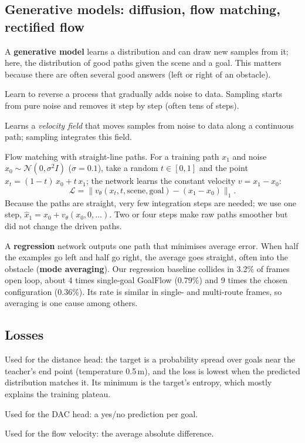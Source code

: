 \documentclass[11pt,a4paper]{article}
\newcommand{\term}[1]{\textbf{#1}}
\begin{document}
\subsection{Generative models: diffusion, flow matching, rectified flow}
A \term{generative model} learns a distribution and can draw new samples from it; here, the distribution of
good paths given the scene and a goal. This matters because there are often several good answers (left or
right of an obstacle).
\begin{description}[style=nextline,leftmargin=0pt]
  \item[Diffusion models] Learn to reverse a process that gradually adds noise to data. Sampling starts from
        pure noise and removes it step by step (often tens of steps).
  \item[Flow matching] Learns a \emph{velocity field} that moves samples from noise to data along a
        continuous path; sampling integrates this field.
  \item[Rectified flow] Flow matching with straight-line paths. For a training path $x_1$ and noise
        $x_0\sim\mathcal{N}(0,\sigma^2 I)$ ($\sigma=0.1$), take a random $t\in[0,1]$ and the point
        $x_t=(1-t)\,x_0+t\,x_1$; the network learns the constant velocity $v=x_1-x_0$:
        \[
          \mathcal{L} = \bigl\lVert v_\theta(x_t,t,\text{scene},\text{goal}) - (x_1-x_0)\bigr\rVert_1 .
        \]
        Because the paths are straight, very few integration steps are needed; we use one step,
        $\hat{x}_1 = x_0 + v_\theta(x_0,0,\dots)$. Two or four steps make raw paths smoother but did not change
        the driven paths.
  \item[Why not plain regression?] A \textbf{regression} network outputs one path that minimises average
        error. When half the examples go left and half go right, the average goes straight, often into the
        obstacle (\term{mode averaging}). Our regression baseline collides in 3.2\% of frames open loop,
        about 4 times single-goal GoalFlow (0.79\%) and 9 times the chosen configuration (0.36\%). Its rate is
        similar in single- and multi-route frames, so averaging is one cause among others.
\end{description}

\subsection{Losses}
\begin{description}[style=nextline,leftmargin=0pt]
  \item[Cross-entropy with soft targets] Used for the distance head: the target is a probability spread over
        goals near the teacher's end point (temperature 0.5\,m), and the loss is lowest when the predicted
        distribution matches it. Its minimum is the target's entropy, which mostly explains the training plateau.
  \item[Binary cross-entropy] Used for the DAC head: a yes/no prediction per goal.
  \item[L1 loss] Used for the flow velocity: the average absolute difference.
\end{description}
\end{document}
